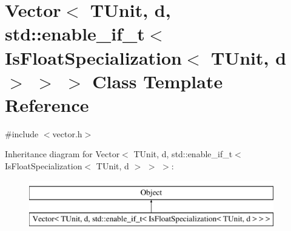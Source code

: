\hypertarget{classVector_3_01TUnit_00_01d_00_01std_1_1enable__if__t_3_01IsFloatSpecialization_3_01TUnit_00_01d_01_4_01_4_01_4}{}\section{Vector$<$ T\+Unit, d, std\+:\+:enable\+\_\+if\+\_\+t$<$ Is\+Float\+Specialization$<$ T\+Unit, d $>$ $>$ $>$ Class Template Reference}
\label{classVector_3_01TUnit_00_01d_00_01std_1_1enable__if__t_3_01IsFloatSpecialization_3_01TUnit_00_01d_01_4_01_4_01_4}


{\ttfamily \#include $<$vector.\+h$>$}

Inheritance diagram for Vector$<$ T\+Unit, d, std\+:\+:enable\+\_\+if\+\_\+t$<$ Is\+Float\+Specialization$<$ T\+Unit, d $>$ $>$ $>$\+:\begin{figure}[H]
\begin{center}
\leavevmode
\includegraphics[height=2.000000cm]{classVector_3_01TUnit_00_01d_00_01std_1_1enable__if__t_3_01IsFloatSpecialization_3_01TUnit_00_01d_01_4_01_4_01_4}
\end{center}
\end{figure}
